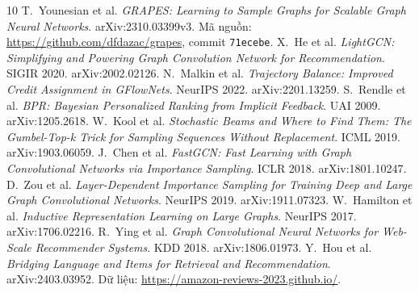 \documentclass[11pt,a4paper]{article}
\begin{document}
\begin{thebibliography}{10}\small
{} T.~Younesian et al. \emph{GRAPES: Learning to Sample Graphs for Scalable Graph Neural Networks}. arXiv:2310.03399v3. Mã nguồn: \url{https://github.com/dfdazac/grapes}, commit \texttt{71ecebe}.
 X.~He et al. \emph{LightGCN: Simplifying and Powering Graph Convolution Network for Recommendation}. SIGIR 2020. arXiv:2002.02126.
 N.~Malkin et al. \emph{Trajectory Balance: Improved Credit Assignment in GFlowNets}. NeurIPS 2022. arXiv:2201.13259.
 S.~Rendle et al. \emph{BPR: Bayesian Personalized Ranking from Implicit Feedback}. UAI 2009. arXiv:1205.2618.
 W.~Kool et al. \emph{Stochastic Beams and Where to Find Them: The Gumbel-Top-k Trick for Sampling Sequences Without Replacement}. ICML 2019. arXiv:1903.06059.
 J.~Chen et al. \emph{FastGCN: Fast Learning with Graph Convolutional Networks via Importance Sampling}. ICLR 2018. arXiv:1801.10247.
 D.~Zou et al. \emph{Layer-Dependent Importance Sampling for Training Deep and Large Graph Convolutional Networks}. NeurIPS 2019. arXiv:1911.07323.
 W.~Hamilton et al. \emph{Inductive Representation Learning on Large Graphs}. NeurIPS 2017. arXiv:1706.02216.
 R.~Ying et al. \emph{Graph Convolutional Neural Networks for Web-Scale Recommender Systems}. KDD 2018. arXiv:1806.01973.
 Y.~Hou et al. \emph{Bridging Language and Items for Retrieval and Recommendation}. arXiv:2403.03952. Dữ liệu: \url{https://amazon-reviews-2023.github.io/}.
\end{thebibliography}
\end{document}
